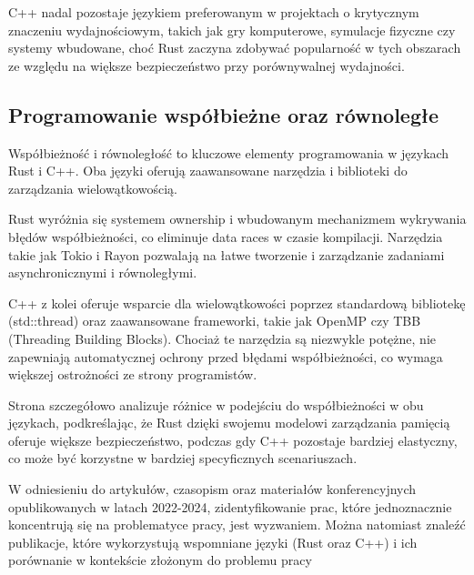 C++ nadal pozostaje językiem preferowanym w projektach o krytycznym znaczeniu wydajnościowym, takich jak gry komputerowe, symulacje fizyczne czy systemy wbudowane, choć Rust zaczyna zdobywać popularność w tych obszarach ze względu na większe bezpieczeństwo przy porównywalnej wydajności. \cite{RustPerformance1, RustPerformance2, RustPerformance3, RustPerformance4}

\subsection{Programowanie współbieżne oraz równoległe}
Współbieżność i równoległość to kluczowe elementy programowania w  językach Rust i C++. Oba języki oferują zaawansowane narzędzia i biblioteki do zarządzania wielowątkowością.

Rust wyróżnia się systemem ownership i wbudowanym mechanizmem wykrywania błędów współbieżności, co eliminuje data races w czasie kompilacji. Narzędzia takie jak Tokio i Rayon pozwalają na łatwe tworzenie i zarządzanie zadaniami asynchronicznymi i równoległymi.

C++ z kolei oferuje wsparcie dla wielowątkowości poprzez standardową bibliotekę (std::thread) oraz zaawansowane frameworki, takie jak OpenMP czy TBB (Threading Building Blocks). Chociaż te narzędzia są niezwykle potężne, nie zapewniają automatycznej ochrony przed błędami współbieżności, co wymaga większej ostrożności ze strony programistów.

Strona \cite{parallelrustcppIntroductionComparing} szczegółowo analizuje różnice w podejściu do współbieżności w obu językach, podkreślając, że Rust dzięki swojemu modelowi zarządzania pamięcią oferuje większe bezpieczeństwo, podczas gdy C++ pozostaje bardziej elastyczny, co może być korzystne w bardziej specyficznych scenariuszach.

W odniesieniu do artykułów, czasopism oraz materiałów konferencyjnych opublikowanych w latach 2022-2024, zidentyfikowanie prac, które jednoznacznie koncentrują się na problematyce pracy, jest wyzwaniem. Można natomiast znaleźć publikacje, które wykorzystują wspomniane języki (Rust oraz C++) i ich porównanie w kontekście złożonym do problemu pracy \cite{}

